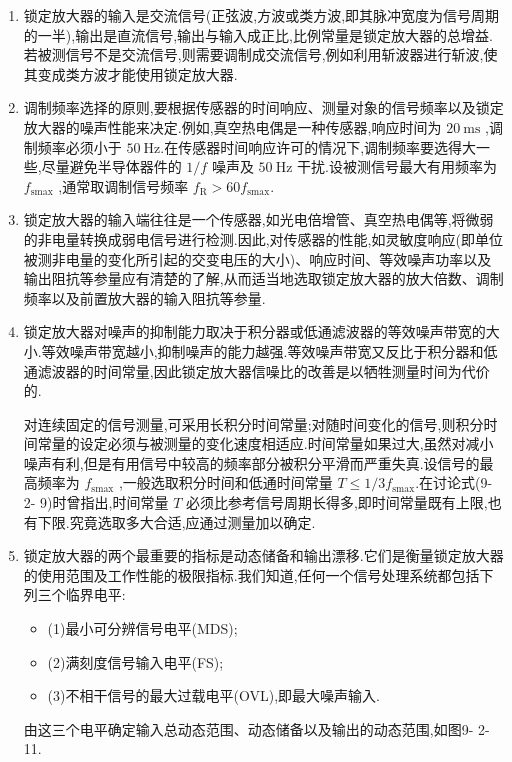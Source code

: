 \documentclass[12pt,a4paper]{article}
\begin{document}
\begin{enumerate}
    \item 锁定放大器的输入是交流信号(正弦波,方波或类方波,即其脉冲宽度为信号周期的一半),输出是直流信号,输出与输入成正比,比例常量是锁定放大器的总增益.若被测信号不是交流信号,则需要调制成交流信号,例如利用斩波器进行斩波,使其变成类方波才能使用锁定放大器.
    \item 调制频率选择的原则,要根据传感器的时间响应、测量对象的信号频率以及锁定放大器的噪声性能来决定.例如,真空热电偶是一种传感器,响应时间为 \(20\mathrm{~ms}\) ,调制频率必须小于 \(50\mathrm{~Hz}\).在传感器时间响应许可的情况下,调制频率要选得大一些,尽量避免半导体器件的 \(1 / f\) 噪声及 \(50\mathrm{~Hz}\) 干扰.设被测信号最大有用频率为 \(f_{\mathrm{s max}}\) ,通常取调制信号频率 \(f_{\mathrm{R}} > 60f_{\mathrm{s max}}\).
    \item 锁定放大器的输入端往往是一个传感器,如光电倍增管、真空热电偶等,将微弱的非电量转换成弱电信号进行检测.因此,对传感器的性能,如灵敏度响应(即单位被测非电量的变化所引起的交变电压的大小)、响应时间、等效噪声功率以及输出阻抗等参量应有清楚的了解,从而适当地选取锁定放大器的放大倍数、调制频率以及前置放大器的输入阻抗等参量.
    \item 锁定放大器对噪声的抑制能力取决于积分器或低通滤波器的等效噪声带宽的大小.等效噪声带宽越小,抑制噪声的能力越强.等效噪声带宽又反比于积分器和低通滤波器的时间常量,因此锁定放大器信噪比的改善是以牺牲测量时间为代价的.

    对连续固定的信号测量,可采用长积分时间常量;对随时间变化的信号,则积分时间常量的设定必须与被测量的变化速度相适应.时间常量如果过大,虽然对减小噪声有利,但是有用信号中较高的频率部分被积分平滑而严重失真.设信号的最高频率为 \(f_{\mathrm{s max}}\) ,一般选取积分时间和低通时间常量 \(T \leqslant 1 / 3 f_{\mathrm{s max}}\).在讨论式(9- 2- 9)时曾指出,时间常量 \(T\) 必须比参考信号周期长得多,即时间常量既有上限,也有下限.究竟选取多大合适,应通过测量加以确定.

    \item 锁定放大器的两个最重要的指标是动态储备和输出漂移.它们是衡量锁定放大器的使用范围及工作性能的极限指标.我们知道,任何一个信号处理系统都包括下列三个临界电平:
    \begin{itemize}
        \item (1)最小可分辨信号电平(MDS);
        \item (2)满刻度信号输入电平(FS);
        \item (3)不相干信号的最大过载电平(OVL),即最大噪声输入.
    \end{itemize}
    由这三个电平确定输入总动态范围、动态储备以及输出的动态范围,如图9- 2- 11.


\end{enumerate}
\end{document}

